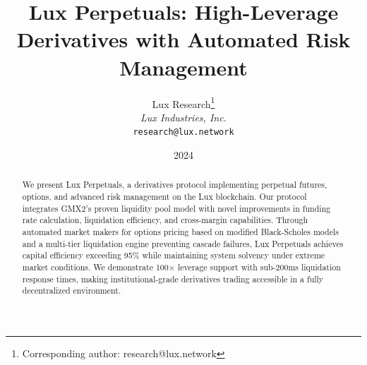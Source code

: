 \documentclass[11pt,a4paper]{article}
\title{\textbf{Lux Perpetuals: High-Leverage Derivatives with Automated Risk Management}}
\author{
Lux Research\thanks{Corresponding author: research@lux.network}\\
\textit{Lux Industries, Inc.}\\
\texttt{research@lux.network}
}
\date{2024}
\begin{document}
\luxcoverpage

\begin{abstract}
We present Lux Perpetuals, a derivatives protocol implementing perpetual futures, options, and advanced risk management on the Lux blockchain. Our protocol integrates GMX2's proven liquidity pool model with novel improvements in funding rate calculation, liquidation efficiency, and cross-margin capabilities. Through automated market makers for options pricing based on modified Black-Scholes models and a multi-tier liquidation engine preventing cascade failures, Lux Perpetuals achieves capital efficiency exceeding 95\% while maintaining system solvency under extreme market conditions. We demonstrate 100$\times$ leverage support with sub-200ms liquidation response times, making institutional-grade derivatives trading accessible in a fully decentralized environment.
\end{abstract}














\end{document}
